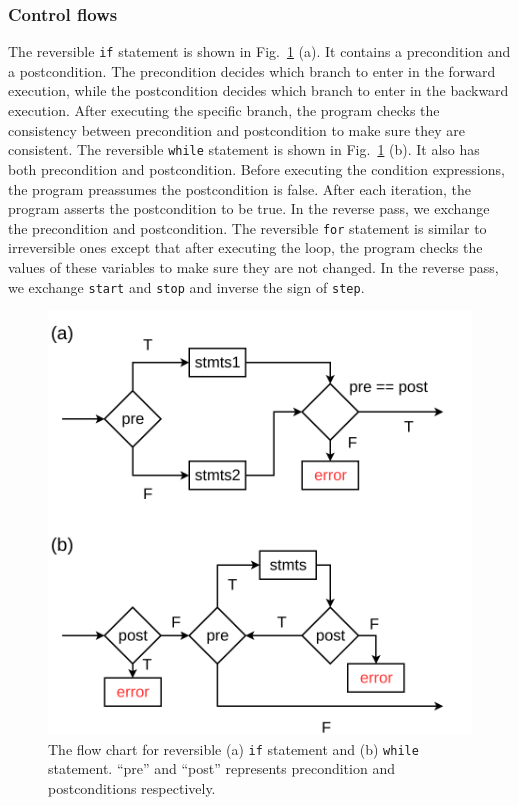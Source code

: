 \documentclass{article}
\newcommand{\<}{\langle}
\renewcommand{\>}{\rangle}
\newcommand{\Fig}[1]{Fig.~\ref{#1}}
\theoremstyle{definition}\newtheorem{definition}{\textit{Definition}}
\begin{document}
\subsubsection{Control flows}
The reversible \texttt{if} statement is shown in \Fig{fig:controlflow} (a). It contains a precondition and a postcondition. The precondition decides which branch to enter in the forward execution, while the postcondition decides which branch to enter in the backward execution. After executing the specific branch, the program checks the consistency between precondition and postcondition to make sure they are consistent.
The reversible \texttt{while} statement is shown in \Fig{fig:controlflow} (b). It also has both precondition and postcondition. Before executing the condition expressions, the program preassumes the postcondition is false.
After each iteration, the program asserts the postcondition to be true. In the reverse pass, we exchange the precondition and postcondition.
The reversible \texttt{for} statement is similar to irreversible ones except that after executing the loop, the program checks the values of these variables to make sure they are not changed. In the reverse pass, we exchange \texttt{start} and \texttt{stop} and inverse the sign of \texttt{step}.
\begin{figure}
    \centerline{\includegraphics[width=0.5\columnwidth,trim={0 0cm 0 0cm},clip]{controlflow.pdf}}
    \caption{The flow chart for reversible (a) \texttt{if} statement and (b) \texttt{while} statement. ``pre'' and ``post'' represents precondition and postconditions respectively.}\label{fig:controlflow}
\end{figure}
\end{document}
